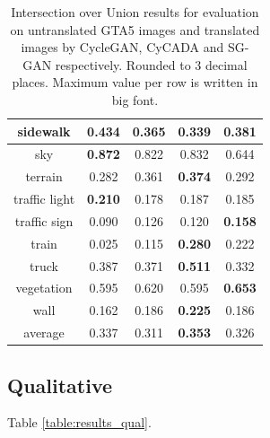 \begin{table}
\begin{tabular}{|c|c|c|c|c|}
		\hline 
		sidewalk & \textbf{0.434} & 0.365 & 0.339 & 0.381\\ 
		\hline 
		sky & \textbf{0.872} & 0.822 & 0.832 & 0.644\\ 
		\hline 
		terrain & 0.282 & 0.361 & \textbf{0.374} & 0.292\\ 
		\hline 
		traffic light & \textbf{0.210} & 0.178 & 0.187 & 0.185\\ 
		\hline 
		traffic sign & 0.090 & 0.126 & 0.120 & \textbf{0.158}\\ 
		\hline 
		train & 0.025 & 0.115 & \textbf{0.280} & 0.222\\ 
		\hline 
		truck & 0.387 & 0.371 & \textbf{0.511} & 0.332\\ 
		\hline 
		vegetation & 0.595 & 0.620 & 0.595 & \textbf{0.653}\\ 
		\hline 
		wall & 0.162 & 0.186 & \textbf{0.225} & 0.186\\ 
		\hline \hline 
		average & 0.337 & 0.311 & \textbf{0.353} & 0.326\\
		\hline
	\end{tabular} 
	\caption{Intersection over Union results for evaluation on untranslated GTA5 images and translated images by CycleGAN, CyCADA and SG-GAN respectively. Rounded to 3 decimal places. Maximum value per row is written in big font.}
	\label{table:results_quant}
\end{table}

\subsection{Qualitative}
Table \ref{table:results_qual}. 






